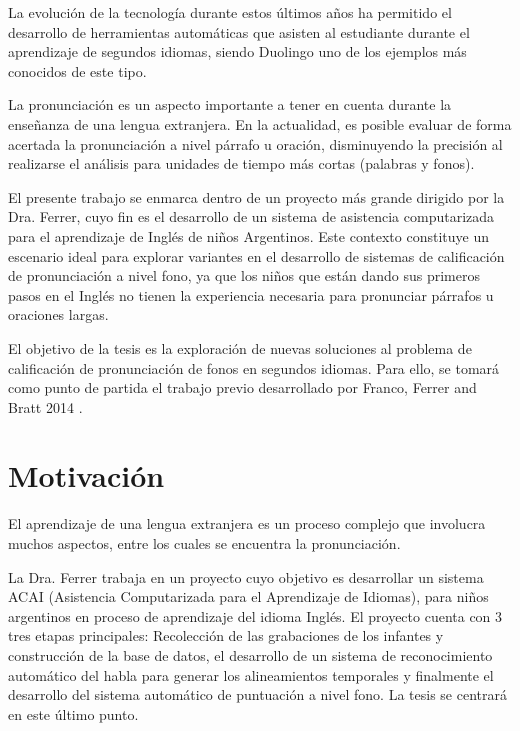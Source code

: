 \documentclass[a4paper,12pt]{article} %
\begin{document}
La evolución de la tecnología durante estos últimos años ha permitido el desarrollo
de herramientas automáticas que asisten al estudiante durante el aprendizaje de 
segundos idiomas, siendo Duolingo uno de los ejemplos más conocidos de este tipo.

La pronunciación es un aspecto importante a tener en cuenta durante la enseñanza
de una lengua extranjera. En la
actualidad, es posible evaluar de forma acertada la pronunciación 
a nivel párrafo u oración, disminuyendo la precisión al 
realizarse el análisis para unidades de tiempo más cortas (palabras y fonos). 

El presente trabajo se enmarca dentro de un proyecto más grande dirigido por la Dra. Ferrer,
cuyo fin es el desarrollo de un sistema de asistencia computarizada para el 
aprendizaje de Inglés de niños Argentinos. Este contexto constituye
un escenario ideal para explorar variantes en el desarrollo de sistemas de calificación
de pronunciación a nivel fono, ya que los niños que están dando sus primeros
pasos en el Inglés no tienen la experiencia necesaria para pronunciar párrafos u oraciones
largas.

El objetivo de la tesis es la exploración de nuevas soluciones al problema de calificación
de pronunciación de fonos en segundos idiomas. Para ello, se tomará como punto de partida
el trabajo previo desarrollado por Franco, Ferrer and Bratt 2014 \cite{franco_ferrer_main_paper}.


\section{Motivación}

El aprendizaje de una lengua extranjera es un proceso complejo que involucra muchos 
aspectos, entre los cuales se encuentra la pronunciación.

La Dra. Ferrer trabaja en un proyecto cuyo objetivo es desarrollar un sistema ACAI 
(Asistencia Computarizada para el Aprendizaje de Idiomas), para niños argentinos 
en proceso de aprendizaje del idioma Inglés. El proyecto cuenta con 3 tres
etapas principales: Recolección de las grabaciones de los infantes y construcción de
la base de datos, el desarrollo de un sistema de reconocimiento automático del habla
para generar los alineamientos temporales y finalmente el desarrollo del sistema
automático de puntuación a nivel fono. La tesis se centrará en este último punto.
\end{document}

